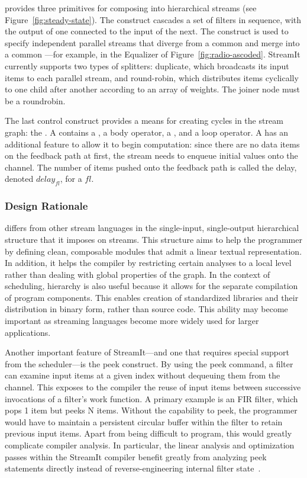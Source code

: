 {\StreamIt} provides three primitives for composing {\filters} into
hierarchical streams (see Figure~\ref{fig:steady-state}).  The
{\pipeline} construct cascades a set of filters in sequence, with the
output of one connected to the input of the next.  The {\splitjoin}
construct is used to specify independent parallel streams that diverge
from a common {\splitter} and merge into a common {\joiner}---for
example, in the Equalizer of Figure~\ref{fig:radio-ascoded}.  StreamIt
currently supports two types of splitters: duplicate, which broadcasts
its input items to each parallel stream, and round-robin, which
distributes items cyclically to one child after another according to
an array of weights.  The joiner node must be a roundrobin.

The last control construct provides a means for creating cycles in the
stream graph: the {\feedbackloop}. A {\feedbackloop} contains a
{\joiner}, a body operator, a {\splitter}, and a loop operator.  A
{\feedbackloop} has an additional feature to allow it to begin
computation: since there are no data items on the feedback path at
first, the stream needs to enqueue initial values onto the channel.
The number of items pushed onto the feedback path is called the delay,
denoted $delay_{fl}$, for a {\feedbackloop} $fl$.

\subsubsection{Design Rationale}

{\StreamIt} differs from other stream languages in the single-input,
single-output hierarchical structure that it imposes on streams.  This
structure aims to help the programmer by defining clean, composable
modules that admit a linear textual representation.  In addition, it
helps the compiler by restricting certain analyses to a local level
rather than dealing with global properties of the graph.  In the
context of scheduling, hierarchy is also useful because it allows for
the separate compilation of program components.  This enables
creation of standardized libraries and their distribution in binary
form, rather than source code.  This ability may become important as
streaming languages become more widely used for larger applications.

Another important feature of StreamIt---and one that requires special
support from the scheduler---is the peek construct.  By using the peek
command, a filter can examine input items at a given index without
dequeuing them from the channel.  This exposes to the compiler the
reuse of input items between successive invocations of a filter's work
function.  A primary example is an FIR filter, which pops 1 item but
peeks N items.  Without the capability to peek, the programmer would
have to maintain a persistent circular buffer within the filter to
retain previous input items.  Apart from being difficult to program,
this would greatly complicate compiler analysis.  In particular, the
linear analysis and optimization passes within the StreamIt compiler
benefit greatly from analyzing peek statements directly instead of
reverse-engineering internal filter state~\cite{lamb03}.

